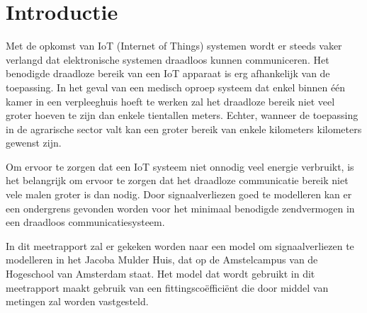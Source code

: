 \section{Introductie} \label{sec:introduction}

Met de opkomst van IoT (Internet of Things) systemen wordt er steeds vaker verlangd dat elektronische systemen draadloos kunnen communiceren. Het benodigde draadloze bereik van een IoT apparaat is erg afhankelijk van de toepassing. In het geval van een medisch oproep systeem dat enkel binnen één kamer in een verpleeghuis hoeft te werken zal het draadloze bereik niet veel groter hoeven te zijn dan enkele tientallen meters. Echter, wanneer de toepassing in de agrarische sector valt kan een groter bereik van enkele kilometers kilometers gewenst zijn. 

Om ervoor te zorgen dat een IoT systeem niet onnodig veel energie verbruikt, is het belangrijk om ervoor te zorgen dat het draadloze communicatie bereik niet vele malen groter is dan nodig. Door signaalverliezen goed te modelleren kan er een ondergrens gevonden worden voor het minimaal benodigde zendvermogen in een draadloos communicatiesysteem.

In dit meetrapport zal er gekeken worden naar een model om signaalverliezen te modelleren in het Jacoba Mulder Huis, dat op de 
Amstelcampus van de Hogeschool van Amsterdam staat. Het model dat wordt gebruikt in dit meetrapport maakt gebruik van een fittingscoëfficiënt die door middel van metingen zal worden vastgesteld.


